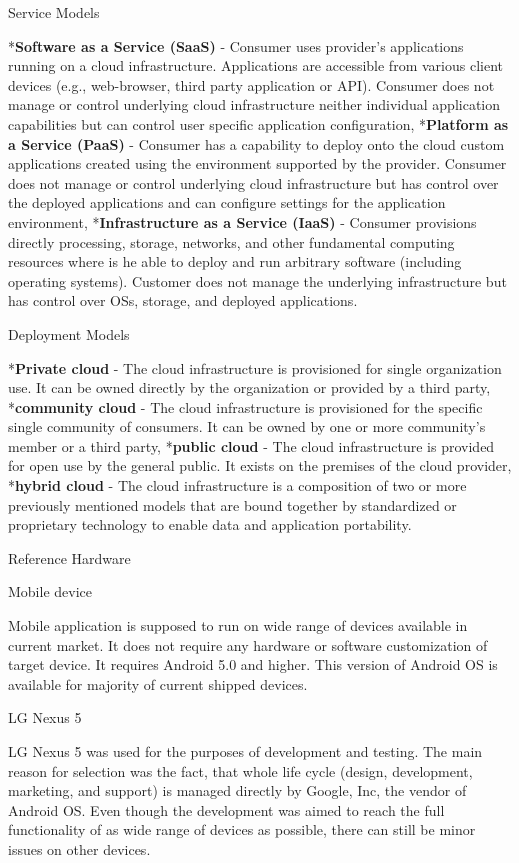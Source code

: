 \seccc Service Models

\begitems
	*{\bf Software as a Service (SaaS)} - Consumer uses provider's applications running on a cloud infrastructure. Applications are accessible from various client devices (e.g., web-browser, third party application or API). Consumer does not manage or control underlying cloud infrastructure neither individual application capabilities but can control user specific application configuration,
	*{\bf Platform as a Service (PaaS)} - Consumer has a capability to deploy onto the cloud custom applications created using the environment supported by the provider. Consumer does not manage or control underlying cloud infrastructure but has control over the deployed applications and can configure settings for the application environment,
	*{\bf Infrastructure as a Service (IaaS)} - Consumer provisions directly processing, storage, networks, and other fundamental computing resources where is he able to deploy and run arbitrary software (including operating systems). Customer does not manage the underlying infrastructure but has control over OSs, storage, and deployed applications.
\enditems

\seccc Deployment Models

\begitems
	*{\bf Private cloud} - The cloud infrastructure is provisioned for single organization use. It can be owned directly by the organization or provided by a third party,
	*{\bf community cloud} - The cloud infrastructure is provisioned for the specific single community of consumers. It can be owned by one or more community's member or a third party,
	*{\bf public cloud} - The cloud infrastructure is provided for open use by the general public. It exists on the premises of the cloud provider,
	*{\bf hybrid cloud} - The cloud infrastructure is a composition of two or more previously mentioned models that are bound together by standardized or proprietary technology to enable data and application portability.
	
\enditems

\sec Reference Hardware

\secc Mobile device

Mobile application is supposed to run on wide range of devices available in current market. It does not require any hardware or software customization of target device. It requires Android 5.0 and higher. This version of Android OS is available for majority of current shipped devices.

\seccc LG Nexus 5

LG Nexus 5 was used for the purposes of development and testing. The main reason for selection was the fact, that whole life cycle (design, development, marketing, and support) is managed directly by Google, Inc, the vendor of Android OS. Even though the development was aimed to reach the full functionality of as wide range of devices as possible, there can still be minor issues on other devices. 

